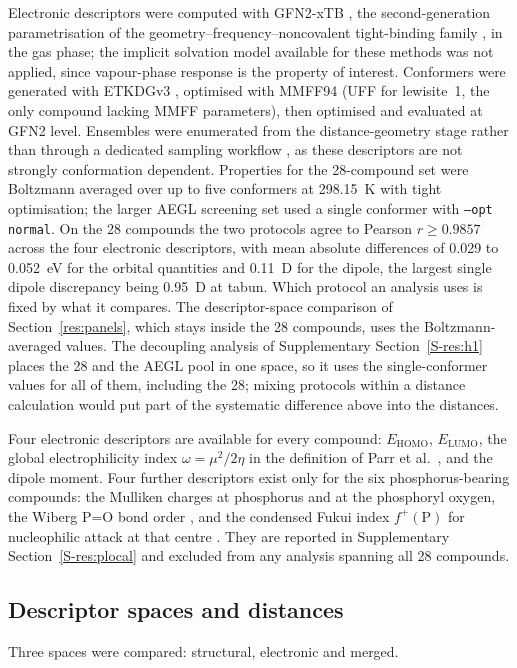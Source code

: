 \documentclass[1p,times]{elsarticle}
\begin{document}
Electronic descriptors were computed with GFN2-xTB
\cite{bannwarth2019}, the second-generation parametrisation of the
geometry--frequency--noncovalent tight-binding family \cite{gfnxtb2017,
xtbreview2021}, in the gas phase; the implicit solvation model available for
these methods \cite{ehlert2021} was not applied, since vapour-phase response is
the property of interest. Conformers were generated with ETKDGv3 \cite{wang2020,riniker2015}, optimised
with MMFF94 \cite{halgren1996} (UFF \cite{rappe1992} for lewisite~1, the only
compound lacking MMFF parameters), then optimised and evaluated at GFN2 level.
Ensembles were enumerated from the distance-geometry stage rather than through a
dedicated sampling workflow \cite{pracht2020}, as these descriptors are not
strongly conformation dependent. Properties for the 28-compound set were
Boltzmann averaged over up to five conformers at 298.15~K with tight
optimisation; the larger AEGL screening set used a single conformer with
\texttt{--opt normal}. On the 28 compounds the two protocols agree to Pearson
$r \ge 0.9857$ across the four electronic descriptors, with mean absolute
differences of 0.029 to 0.052~eV for the orbital quantities and 0.11~D for the
dipole, the largest single dipole discrepancy being 0.95~D at tabun. Which
protocol an analysis uses is fixed by what it compares. The descriptor-space comparison of
Section~\ref{res:panels}, which stays inside the 28 compounds, uses the
Boltzmann-averaged values. The decoupling analysis of Supplementary Section~\ref{S-res:h1}
places the 28 and the AEGL pool in one space, so it uses the single-conformer
values for all of them, including the 28; mixing protocols within a distance
calculation would put part of the systematic difference above into the
distances.

Four electronic descriptors are available for every compound: $E_\mathrm{HOMO}$,
$E_\mathrm{LUMO}$, the global electrophilicity index
$\omega=\mu^{2}/2\eta$ in the definition of Parr et al.~\cite{parr1999}, and the dipole
moment. Four further descriptors exist only for the six phosphorus-bearing
compounds: the Mulliken charges at phosphorus and at the phosphoryl oxygen, the
Wiberg P=O bond order \cite{wiberg1968}, and the condensed Fukui index
$f^{+}(\mathrm{P})$ for nucleophilic attack at that centre
\cite{parryang1984,yangmortier1986,geerlings2003}. They are reported in
Supplementary Section~\ref{S-res:plocal} and excluded from any analysis spanning
all 28 compounds.

\subsection{Descriptor spaces and distances}
\label{meth:spaces}
Three spaces were compared: structural, electronic and merged.
\end{document}
